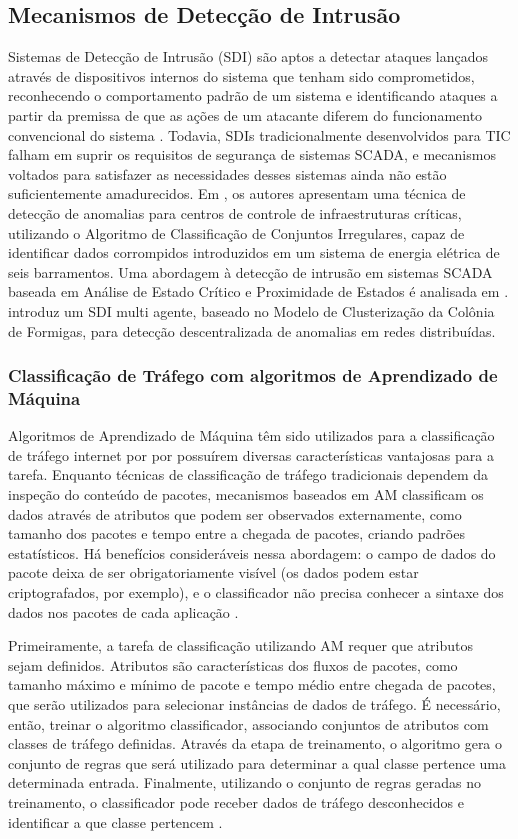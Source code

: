 \documentclass[cic,tc]{iiufrgs}
\begin{document}
\subsection{Mecanismos de Detecção de Intrusão}
\label{subsecmecs}
Sistemas de Detecção de Intrusão (SDI) são aptos a detectar ataques lançados através de dispositivos internos do sistema que tenham sido comprometidos, reconhecendo o comportamento padrão de um sistema e identificando ataques a partir da premissa de que as ações de um atacante diferem do funcionamento convencional do sistema \cite{li2012securing}. Todavia, SDIs tradicionalmente desenvolvidos para TIC falham em suprir os requisitos de segurança de sistemas SCADA, e mecanismos voltados para satisfazer as necessidades desses sistemas ainda não estão suficientemente amadurecidos. Em \cite{coutinho2009anomaly}, os autores apresentam uma técnica de detecção de anomalias para centros de controle de infraestruturas críticas, utilizando o Algoritmo de Classificação de Conjuntos Irregulares, capaz de identificar dados corrompidos introduzidos em um sistema de energia elétrica de seis barramentos. Uma abordagem à detecção de intrusão em sistemas SCADA baseada em Análise de Estado Crítico e Proximidade de Estados é analisada em \cite{carcano2011multidim}. \cite{tsang2005multi} introduz um SDI multi agente, baseado no Modelo de Clusterização da Colônia de Formigas, para detecção descentralizada de anomalias em redes distribuídas.

\subsubsection{Classificação de Tráfego com algoritmos de Aprendizado de Máquina}
Algoritmos de Aprendizado de Máquina têm sido utilizados para a classificação de tráfego internet por por possuírem diversas características vantajosas para a tarefa. Enquanto técnicas de classificação de tráfego tradicionais dependem da inspeção do conteúdo de pacotes, mecanismos baseados em AM classificam os dados através de atributos que podem ser observados externamente, como tamanho dos pacotes e tempo entre a chegada de pacotes, criando padrões estatísticos. Há benefícios consideráveis nessa abordagem: o campo de dados do pacote deixa de ser obrigatoriamente visível  (os dados podem estar criptografados, por exemplo), e o classificador não precisa conhecer a sintaxe dos dados nos pacotes de cada aplicação \cite{nguyen2008survey}.

Primeiramente, a tarefa de classificação utilizando AM requer que atributos sejam definidos. Atributos são características dos fluxos de pacotes, como tamanho máximo e mínimo de pacote e tempo médio entre chegada de pacotes, que serão utilizados para selecionar instâncias de dados de tráfego. É necessário, então, treinar o algoritmo classificador, associando conjuntos de atributos com classes de tráfego definidas. Através da etapa de treinamento, o algoritmo gera o conjunto de regras que será utilizado para determinar a qual classe pertence uma determinada entrada. Finalmente, utilizando o conjunto de regras geradas no treinamento, o classificador pode receber dados de tráfego desconhecidos e identificar a que classe pertencem \cite{nguyen2008survey}.
\end{document}
